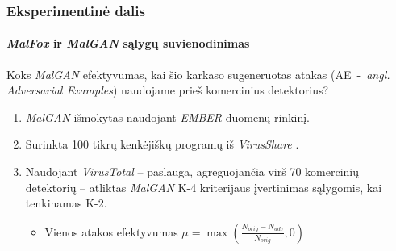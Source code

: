 \begin{frame}
    \frametitle{Eksperimentinė dalis}
    \framesubtitle{\textit{MalFox} ir \textit{MalGAN} sąlygų suvienodinimas}
    Koks \textit{MalGAN} efektyvumas, kai šio karkaso sugeneruotas atakas (AE~-~\textit{angl. Adversarial Examples}) naudojame prieš komercinius detektorius? \pause
    \vspace{20pt}
    \begin{enumerate}
        \item \textit{MalGAN} išmokytas naudojant \textit{EMBER} \cite{andersonEMBEROpenDataset2018} duomenų rinkinį. \pause
        \item Surinkta 100 tikrų kenkėjiškų programų iš \textit{VirusShare}
              \cite{VirusSharecom}. \pause
        \item Naudojant \textit{VirusTotal} \cite{VirusTotalHome} -- paslauga, agreguojančia
              virš 70 komercinių detektorių -- atliktas \textit{MalGAN} K-4 kriterijaus
              įvertinimas sąlygomis, kai tenkinamas K-2. \pause
              \begin{itemize}
                \vspace{10pt}
                  \item Vienos atakos efektyvumas $\mu = \max{\left(\frac{N_{orig} - N_{adv}}{N_{orig}}, 0\right)}$
              \end{itemize}
    \end{enumerate}

\end{frame}

